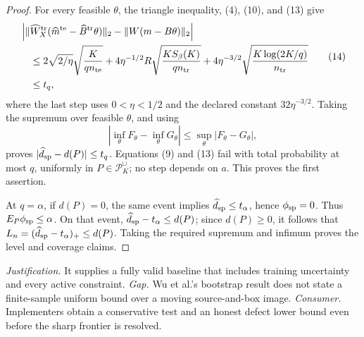 \documentclass{article}
\begin{document}
\begin{proof}
For every feasible \(\theta\), the triangle inequality, (4), (10), and (13) give
\[
 \begin{split}
 &\left|\|\widehat W_X^{\rm tr}(\widehat m^{\rm te}-\widehat B^{\rm tr}\theta)\|_2
 -\|W(m-B\theta)\|_2\right|\\
 &\quad\le
 2\sqrt{2/\eta}\sqrt{\frac K{q n_{\rm te}}}
 +4\eta^{-1/2}R\sqrt{\frac{KS_\beta(K)}{q n_{\rm tr}}}
 +4\eta^{-3/2}\sqrt{\frac{K\log(2K/q)}{n_{\rm tr}}}\\
 &\quad\le t_q,
 \end{split}\tag{14}
\]
where the last step uses \(0<\eta<1/2\) and the declared constant \(32\eta^{-3/2}\).  Taking the supremum over feasible \(\theta\), and using
\[
 \left|\inf_\theta F_\theta-\inf_\theta G_\theta\right|
 \le\sup_\theta|F_\theta-G_\theta|, \tag{15}
\]
proves \(|\widehat d_{\rm sp}-d(P)|\le t_q\).  Equations (9) and (13) fail with total probability at most \(q\), uniformly in \(P\in\mathcal P_K^\cup\); no step depends on \(a\).  This proves the first assertion.

At \(q=\alpha\), if \(d(P)=0\), the same event implies \(\widehat d_{\rm sp}\le t_\alpha\), hence \(\phi_{\rm sp}=0\).  Thus \(E_P\phi_{\rm sp}\le\alpha\).  On that event, \(\widehat d_{\rm sp}-t_\alpha\le d(P)\); since \(d(P)\ge0\), it follows that \(L_n=(\widehat d_{\rm sp}-t_\alpha)_+\le d(P)\).  Taking the required supremum and infimum proves the level and coverage claims.
\end{proof}
\par\smallskip\noindent \textit{Justification.} It supplies a fully valid baseline that includes training uncertainty and every active constraint. \textit{Gap.} Wu et al.'s bootstrap result does not state a finite-sample uniform bound over a moving source-and-box image. \textit{Consumer.} Implementers obtain a conservative test and an honest defect lower bound even before the sharp frontier is resolved.
\end{document}
